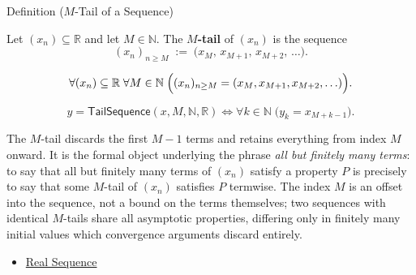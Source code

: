 \begin{definitionbox}{Definition ($M$-Tail of a Sequence)}
\begin{definition}
\label{def:m-tail}

Let $(x_n) \subseteq \mathbb{R}$ and let $M \in \mathbb{N}$. The
\textbf{$M$-tail} of $(x_n)$ is the sequence
\[
    (x_n)_{n \ge M} \;:=\; \bigl(x_M,\, x_{M+1},\, x_{M+2},\, \ldots\bigr).
\]
\end{definition}
\end{definitionbox}

\begin{remark*}
\[
\forall (x_n) \subseteq \mathbb{R} \;\forall M \in \mathbb{N}
\;\Bigl(
    (x_n)_{n \ge M} = (x_M,x_{M+1},x_{M+2},\ldots)
\Bigr).
\]
\end{remark*}

\begin{remark*}
\[
y=\mathsf{TailSequence}(x,M,\mathbb{N},\mathbb{R})
\Longleftrightarrow
\forall k \in \mathbb{N}\;\bigl(y_k = x_{M+k-1}\bigr).
\]
\end{remark*}

\begin{remark*}[Interpretation]
The $M$-tail discards the first $M - 1$ terms and retains everything
from index $M$ onward. It is the formal object underlying the phrase
\emph{all but finitely many terms}: to say that all but finitely many
terms of $(x_n)$ satisfy a property $P$ is precisely to say that some
$M$-tail of $(x_n)$ satisfies $P$ termwise. The index $M$ is an offset
into the sequence, not a bound on the terms themselves; two sequences
with identical $M$-tails share all asymptotic properties, differing
only in finitely many initial values which convergence arguments
discard entirely.
\end{remark*}

\begin{dependencies}
\begin{itemize}
  \item \hyperref[def:real-sequence]{Real Sequence}
\end{itemize}
\end{dependencies}



